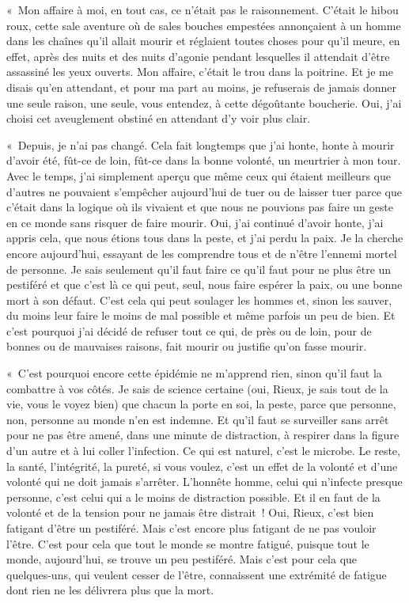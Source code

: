 \documentclass[french,twoside]{book} %
\begin{document}
« Mon affaire à moi, en tout cas, ce n’était pas le raisonnement. C’était le hibou roux, cette sale aventure où de sales bouches empestées annonçaient à un homme dans les chaînes qu’il allait mourir et réglaient toutes choses pour qu’il meure, en effet, après des nuits et des nuits d’agonie pendant lesquelles il attendait d’être assassiné les yeux ouverts. Mon affaire, c’était le trou dans la poitrine. Et je me disais qu’en attendant, et pour ma part au moins, je refuserais de jamais donner une seule raison, une seule, vous entendez, à cette dégoûtante boucherie. Oui, j’ai choisi cet aveuglement obstiné en attendant d’y voir plus clair.\par
« Depuis, je n’ai pas changé. Cela fait longtemps que j’ai honte, honte à mourir d’avoir été, fût-ce de loin, fût-ce dans la bonne volonté, un meurtrier à mon tour. Avec le temps, j’ai simplement aperçu que même ceux qui étaient meilleurs que d’autres ne pouvaient s’empêcher aujourd’hui de tuer ou de laisser tuer parce que c’était dans la logique où ils vivaient et que nous ne pouvions pas faire un geste en ce monde sans risquer de faire mourir. Oui, j’ai continué d’avoir honte, j’ai appris cela, que nous étions tous dans la peste, et j’ai perdu la paix. Je la cherche encore aujourd’hui, essayant de les comprendre tous et de n’être l’ennemi mortel de personne. Je sais seulement qu’il faut faire ce qu’il faut pour ne plus être un pestiféré et que c’est là ce qui peut, seul, nous faire espérer la paix, ou une bonne mort à son défaut. C’est cela qui peut soulager les hommes et, sinon les sauver, du moins leur faire le moins de mal possible et même parfois un peu de bien. Et c’est pourquoi j’ai décidé de refuser tout ce qui, de près ou de loin, pour de bonnes ou de mauvaises raisons, fait mourir ou justifie qu’on fasse mourir.\par
« C’est pourquoi encore cette épidémie ne m’apprend rien, sinon qu’il faut la combattre à vos côtés. Je sais de science certaine (oui, Rieux, je sais tout de la vie, vous le voyez bien) que chacun la porte en soi, la peste, parce que personne, non, personne au monde n’en est indemne. Et qu’il faut se surveiller sans arrêt pour ne pas être amené, dans une minute de distraction, à respirer dans la figure d’un autre et à lui coller l’infection. Ce qui est naturel, c’est le microbe. Le reste, la santé, l’intégrité, la pureté, si vous voulez, c’est un effet de la volonté et d’une volonté qui ne doit jamais s’arrêter. L’honnête homme, celui qui n’infecte presque personne, c’est celui qui a le moins de distraction possible. Et il en faut de la volonté et de la tension pour ne jamais être distrait ! Oui, Rieux, c’est bien fatigant d’être un pestiféré. Mais c’est encore plus fatigant de ne pas vouloir l’être. C’est pour cela que tout le monde se montre fatigué, puisque tout le monde, aujourd’hui, se trouve un peu pestiféré. Mais c’est pour cela que quelques-uns, qui veulent cesser de l’être, connaissent une extrémité de fatigue dont rien ne les délivrera plus que la mort.\par
\end{document}
